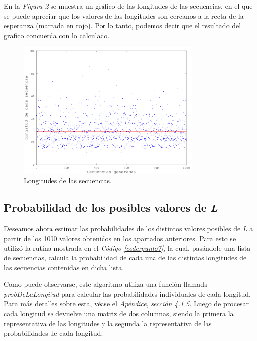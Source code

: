 \documentclass{article}
\newcommand{\refcode}[1]{\textit{Código \ref{#1}}}
\begin{document}
\bigskip
En la \textit{Figura 2} se muestra un gráfico de las longitudes de las secuencias, en el que se puede apreciar que los valores de las longitudes son cercanos a la recta de la esperanza (marcada en rojo). Por lo tanto, podemos decir que el resultado del grafico concuerda con lo calculado. \\

\begin{figure}[h]
	\centering
	\includegraphics[width=0.80\textwidth]{images/longitudes.png}
	\caption{Longitudes de las secuencias.}
\end{figure}
\bigskip



\subsection{Probabilidad de los posibles valores de \textit{L}}

Deseamos ahora estimar las probabilidades de los distintos valores posibles de \textit{L} a partir de los 1000 valores obtenidos en los apartados anteriores. Para esto se utilizó la rutina mostrada en el \refcode{code:punto7}, la cual, pasándole una lista de secuencias, calcula la probabilidad de cada una de las distintas longitudes de las secuencias contenidas en dicha lista.
	\par
	Como puede observarse, este algoritmo utiliza una función llamada \textit{probDeLaLongitud} para calcular las probabilidades individuales de cada longitud. Para más detalles sobre esta, véase el \textit{Apéndice}, \textit{sección 4.1.5}. Luego de procesar cada longitud se devuelve una matriz de dos columnas, siendo la primera la representativa de las longitudes y la segunda la representativa de las probabilidades de cada longitud.
\end{document}
